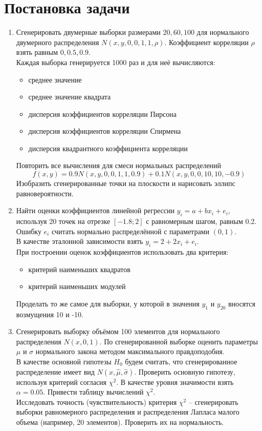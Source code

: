 \section{Постановка задачи}

\begin{enumerate}
	\item Сгенерировать двумерные выборки размерами $20, 60, 100$ для нормального двумерного распределения $N(x,y,0,0,1,1,\rho)$. Коэффициент корреляции $\rho$ взять равным $0, 0.5, 0.9$. \\ 
	Каждая выборка генерируется 1000 раз и для неё вычисляются:
	\begin{itemize}
		\item среднее значение
		\item среднее значение квадрата
		\item дисперсия коэффициентов корреляции Пирсона
		\item дисперсия коэффициентов корреляции Спирмена
		\item дисперсия квадрантного коэффициента корреляции
	\end{itemize}
	Повторить все вычисления для смеси нормальных распределений
	\begin{equation} \label{eq:mix_gauss}
		f(x,y)=0.9 N(x,y,0,0,1,1,0.9) + 0.1N(x,y,0,0,10,10,-0.9)
	\end{equation}
	Изобразить сгенерированные точки на плоскости и нарисовать эллипс равновероятности.
	
	\item Найти оценки коэффициентов линейной регрессии $y_i = a + b x_i + e_i$, используя 20 точек на отрезке $[-1.8; 2]$ с равномерным шагом, равным 0.2. Ошибку $e_i$ считать нормально распределённой с параметрами $(0, 1)$. \\
	В качестве эталонной зависимости взять $y_i = 2 + 2 x_i + e_i$. \\
	При построении оценок коэффициентов использовать два критерия:
	\begin{itemize}
		\item критерий наименьших квадратов
		\item критерий наименьших модулей
	\end{itemize}
	Проделать то же самое для выборки, у которой в значения $y_1 \text{ и } y_{20}$ вносятся возмущения 10 и -10.
	
	\item Сгенерировать выборку объёмом 100 элементов для нормального распределения $N(x,0,1)$. По сгенерированной выборке оценить параметры $\mu \text{ и } \sigma$ нормального закона методом максимального правдоподобия. \\
	В качестве основной гипотезы $H_0$ будем считать, что сгенерированное распределение имеет вид $N(x,\hat{\mu},\hat{\sigma})$. Проверить основную гипотезу, используя критерий согласия $\chi^2$. В качестве уровня значимости взять $\alpha=0.05$. Привести таблицу вычислений $\chi^2$. \\
	Исследовать точность (чувствительность) критерия $\chi^2$ -- сгенерировать выборки равномерного распределения и распределения Лапласа малого объема (например, 20 элементов). Проверить их на нормальность.
	

\end{enumerate}
